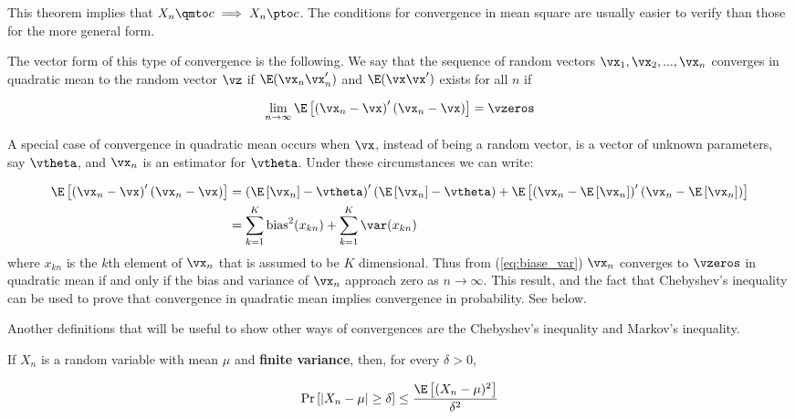 \documentclass[english,12pt]{book}\usepackage[]{graphicx}\usepackage[]{xcolor}
\begin{document}
This theorem implies that $X_n\qmto c \implies X_n\pto c$. The conditions for convergence in mean square are usually easier to verify than those for the more general form.

The vector form of this type of convergence is the following. We say that the sequence of random vectors $\vx_1, \vx_2,...,\vx_n$ converges in quadratic mean to the random vector $\vz$ if $\E(\vx_n\vx_n')$ and $\E(\vx\vx')$ exists for all $n$ if

\begin{equation*}
  \lim_{n\to \infty} \E\left[\left(\vx_n  - \vx\right)'\left(\vx_n  - \vx\right)\right] = \vzeros
\end{equation*}

A special case of convergence in quadratic mean occurs when $\vx$, instead of being a random vector, is a vector of unknown parameters, say $\vtheta$, and $\vx_n$ is an estimator for $\vtheta$. Under these circumstances we can write:

\begin{equation}\label{eq:biase_var}
  \begin{aligned}
    \E\left[\left(\vx_n  - \vx\right)'\left(\vx_n  - \vx\right)\right] & = \left(\E\left[\vx_n\right]  - \vtheta\right)'\left(\E\left[\vx_n\right]  - \vtheta\right) + \E\left[\left(\vx_n - \E\left[\vx_n\right]\right)'\left(\vx_n - \E\left[\vx_n\right]\right)\right] \\
    & = \sum_{k = 1}^K\mbox{bias}^2(x_{kn}) + \sum_{k = 1}^K \var(x_{kn})
  \end{aligned}
\end{equation}
%
where $x_{kn}$ is the $k$th element of $\vx_n$ that is assumed to be $K$ dimensional. Thus from (\ref{eq:biase_var}) $\vx_n$ converges to $\vzeros$ in quadratic mean if and only if the bias and variance of $\vx_n$ approach zero as $n\to\infty$. This result, and the fact that Chebyshev's inequality can be used to prove that convergence in quadratic mean implies convergence in probability. See below.

Another definitions that will be useful to show other ways of convergences are the Chebyshev's inequality and Markov's inequality.

\begin{definition}\label{definition:chebyshev_ineq}
	 If $X_n$ is a random variable with mean $\mu$ and \textbf{finite variance}, then, for every $\delta > 0$,
	 
	 \begin{equation*}
	 \Pr\left[\left| X_n - \mu\right|\geq \delta \right]\leq \frac{\E\left[(X_n - \mu)^2\right]}{\delta ^2}
	 \end{equation*}
\end{definition}
\end{document}
